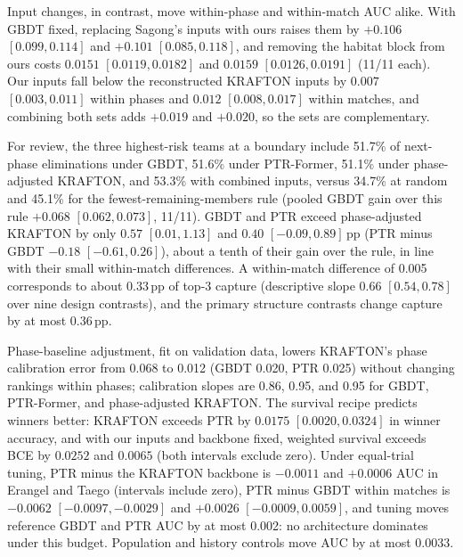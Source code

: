 \documentclass[sigconf,anonymous,nonacm]{acmart}
\begin{document}
Input changes, in contrast, move within-phase and within-match AUC alike. With GBDT fixed, replacing Sagong's inputs with ours raises them by $+0.106$ $[0.099,\allowbreak 0.114]$ and $+0.101$ $[0.085,\allowbreak 0.118]$, and removing the habitat block from ours costs $0.0151$ $[0.0119,\allowbreak 0.0182]$ and $0.0159$ $[0.0126,\allowbreak 0.0191]$ (11/11 each). Our inputs fall below the reconstructed KRAFTON inputs by $0.007$ $[0.003,\allowbreak 0.011]$ within phases and $0.012$ $[0.008,\allowbreak 0.017]$ within matches, and combining both sets adds $+0.019$ and $+0.020$, so the sets are complementary.

For review, the three highest-risk teams at a boundary include 51.7\% of next-phase eliminations under GBDT, 51.6\% under PTR-Former, 51.1\% under phase-adjusted KRAFTON, and 53.3\% with combined inputs, versus 34.7\% at random and 45.1\% for the fewest-remaining-members rule (pooled GBDT gain over this rule $+0.068$ $[0.062,\allowbreak 0.073]$, 11/11). GBDT and PTR exceed phase-adjusted KRAFTON by only $0.57$ $[0.01,\allowbreak 1.13]$ and $0.40$ $[-0.09,\allowbreak 0.89]$\,pp (PTR minus GBDT $-0.18$ $[-0.61,\allowbreak 0.26]$), about a tenth of their gain over the rule, in line with their small within-match differences. A within-match difference of 0.005 corresponds to about 0.33\,pp of top-3 capture (descriptive slope 0.66 $[0.54,\allowbreak 0.78]$ over nine design contrasts), and the primary structure contrasts change capture by at most 0.36\,pp.

Phase-baseline adjustment, fit on validation data, lowers KRAFTON's phase calibration error from 0.068 to 0.012 (GBDT 0.020, PTR 0.025) without changing rankings within phases; calibration slopes are 0.86, 0.95, and 0.95 for GBDT, PTR-Former, and phase-adjusted KRAFTON. The survival recipe predicts winners better: KRAFTON exceeds PTR by $0.0175$ $[0.0020,\allowbreak 0.0324]$ in winner accuracy, and with our inputs and backbone fixed, weighted survival exceeds BCE by $0.0252$ and $0.0065$ (both intervals exclude zero). Under equal-trial tuning, PTR minus the KRAFTON backbone is $-0.0011$ and $+0.0006$ AUC in Erangel and Taego (intervals include zero), PTR minus GBDT within matches is $-0.0062$ $[-0.0097,\allowbreak -0.0029]$ and $+0.0026$ $[-0.0009,\allowbreak 0.0059]$, and tuning moves reference GBDT and PTR AUC by at most 0.002: no architecture dominates under this budget. Population and history controls move AUC by at most 0.0033.


\end{document}
